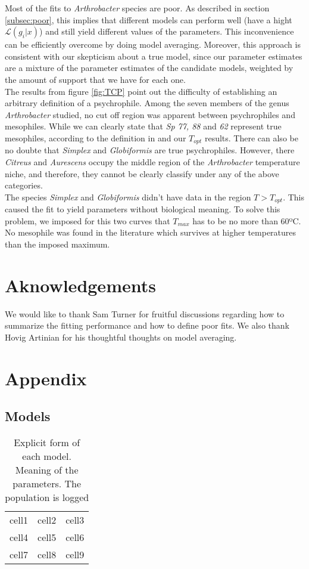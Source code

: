 \documentclass[titlepage,11pt]{article}
\begin{document}
\begin{linenumbers}
		Most of the fits to \textit{Arthrobacter} species are poor. As described in section \ref{subsec:poor}, this implies that different models can perform well (have a hight $ \mathcal{L}(g_i|x) $) and still yield different values of the parameters. This inconvenience can be efficiently overcome by doing model averaging. Moreover, this approach is consistent with our skepticism about a true model, since our parameter estimates are a mixture of the parameter estimates of the candidate models, weighted by the amount of support that we have for each one. \\
		The results from figure \ref{fig:TCP} point out the difficulty of establishing an arbitrary definition of a psychrophile. Among the seven members of the genus \textit{Arthrobacter} studied, no cut off region was apparent between  psychrophiles and mesophiles. While we can clearly state that \textit{Sp 77, 88} and \textit{62} represent true mesophiles, according to the definition in \cite{INGRAHAM1958} and our $ T_{opt} $ results. There can also be no doubte that \textit{Simplex} and \textit{Globiformis} are true psychrophiles. However, there \textit{Citreus} and \textit{Aurescens} occupy the middle region of the \textit{Arthrobacter} temperature niche, and therefore, they cannot be clearly classify under any of the above categories. \\
		The species \textit{Simplex} and \textit{Globiformis} didn't have data in the region $ T > T_{opt} $. This caused the fit to yield parameters without biological meaning. To solve this problem, we imposed for this two curves that $ T_{max} $ has to be no more than 60ºC. No mesophile was found in the literature \cite{Schiraldi2014} which survives at higher temperatures than the imposed maximum. \\
		\section{Aknowledgements}
		We would like to thank Sam Turner for fruitful discussions regarding how to summarize the fitting performance and how to define poor fits. We also thank Hovig Artinian for his thoughtful thoughts on model averaging. 
		\newpage
		\section{Appendix}
		\subsection{Models}
		\begin{linenomath*}
			\begin{table}[h]
				\centering
				\begin{tabular}{ c c c }
					cell1 & cell2 & cell3 \\ 
					cell4 & cell5 & cell6 \\  
					cell7 & cell8 & cell9    
				\end{tabular}
				\caption{\label{tab:model_eqs}Explicit form of each model. Meaning of the parameters. The population is logged}
			\end{table}
		\end{linenomath*}
		

\end{linenumbers}
\end{document}
